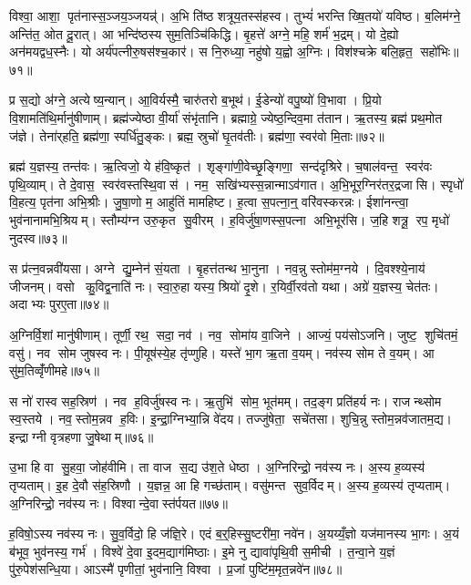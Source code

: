 विश्वा॒ आशा॒ पृत॑नास्स॒ञ्जय॒ञ्जयन्न्॑। अ॒भि ति॑ष्ठ शत्रूय॒तस्स॑हस्व। तुभ्यं॑ भरन्ति ख्षि॒तयो॑ यविष्ठ। ब॒लिम॑ग्ने॒ अन्ति॑त॒ ओत दू॒रात्। आ भन्दि॑ष्ठस्य सुम॒तिञ्चि॑किद्धि। बृ॒हत्ते॑ अग्ने॒ महि॒ शर्म॑ भ॒द्रम्। यो दे॒ह्यो अन॑मयद्वध॒स्नैः। यो अर्य॑पत्नीरु॒षस॑श्च॒कार॑। स नि॒रुध्या॒ नहु॑षो य॒ह्वो अ॒ग्निः। विश॑श्चक्रे बलि॒हृत॒ सहो॑भिः॥७१॥

प्र स॒द्यो अ॑ग्ने॒ अत्येष्य॒न्यान्। आ॒विर्यस्मै॒ चारु॑तरो ब॒भूथ॑। ई॒डेन्यो॑ वपु॒ष्यो॑ वि॒भावा। प्रि॒यो वि॒शामति॑थि॒र्मानु॑षीणाम्। ब्रह्म॑ज्येष्ठा वी॒र्या॑ संभृ॑तानि। ब्रह्माग्रे॒ ज्येष्ठ॒न्दिव॒मा त॑तान। ऋ॒तस्य॒ ब्रह्म॑ प्रथ॒मोत ज॑ज्ञे। तेना॑र्‌हति॒ ब्रह्म॑णा॒ स्पर्धि॑तु॒ङ्कः। ब्रह्म॒ स्रुचो॑ घृ॒तव॑तीः। ब्रह्म॑णा॒ स्वर॑वो मि॒ताः॥७२॥

ब्रह्म॑ य॒ज्ञस्य॒ तन्त॑वः। ऋ॒त्विजो॒ ये ह॑वि॒ष्कृत॑। शृङ्गा॑णी॒वेच्छृ॒ङ्गिणा॒ सन्द॑दृश्रिरे। च॒षाल॑वन्त॒ स्वर॑वः पृथि॒व्याम्। ते दे॒वास॒ स्वर॑वस्तस्थि॒वास॑। नम॒ सखि॑भ्यस्स॒न्नान्माऽव॑गात। अ॒भि॒भूर॒ग्निर॑तर॒द्रजासि। स्पृधो॑ वि॒हत्य॒ पृत॑ना अभि॒श्रीः। जु॒षा॒णो म॒ आहु॑तिं मामहिष्ट। ह॒त्वा स॒पत्ना॒न्॒ वरि॑वस्करन्नः। ईशा॑नन्त्वा॒ भुव॑नानामभि॒श्रियम्। स्तौम्य॑ग्न उरु॒कृत सु॒वीरम्। ह॒विर्जु॑षा॒णस्स॒पत्ना अभि॒भूर॑सि। ज॒हि शत्रू॒ रप॒ मृधो॑ नुदस्व॥७३॥\anuvakamend[वि॒शाञ्ज॑यामसि जीरदानो॒ हर्या॒ विश्वा॒ दिवि॑ष्टिषु॒ वसू॑नि जिगी॒वान्थ्सहो॑भिर्मि॒ता न॑श्च॒त्वारि॑ च]

स प्र॑त्न॒वन्नवी॑यसा। अग्ने द्यु॒म्नेन॑ सं॒यता। बृ॒हत्त॑तन्थ भा॒नुना। नव॒न्नु स्तोम॑म॒ग्नये। दि॒वश्श्ये॒नाय॑ जीजनम्। वसो कु॒विद्व॒नाति॑ नः। स्वा॒रु॒हा यस्य॒ श्रियो॑ दृ॒शे। र॒यिर्वी॒रव॑तो यथा। अग्रे॑ य॒ज्ञस्य॒ चेत॑तः। अदाभ्यः पुरए॒ता॥७४॥

अ॒ग्निर्वि॒शां मानु॑षीणाम्। तूर्णी॒ रथ॒ सदा॒ नव॑। नव॒ सोमा॑य वा॒जिने। आज्यं॒ पय॑सोऽजनि। जुष्ट॒ शुचि॑तमं॒ वसु॑। नव सोम जुषस्व नः। पी॒यूष॑स्ये॒ह तृ॑प्णुहि। यस्ते॑ भा॒ग ऋ॒ता व॒यम्। नव॑स्य सोम ते व॒यम्। आ सु॑म॒तिव्वृँ॑णीमहे॥७५॥

स नो॑ रास्व सह॒स्रिण॑। नव ह॒विर्जु॑षस्व नः। ऋ॒तुभि॑ सोम॒ भूत॑मम्। तद॒ङ्ग प्रति॑हर्य नः। राजन्थ्सोम स्व॒स्तये। नव॒स्तोम॒न्नव ह॒विः। इ॒न्द्रा॒ग्निभ्या॒न्नि वे॑दय। तज्जु॑षेता॒ सचे॑तसा। शुचि॒न्नु स्तोम॒न्नव॑जातम॒द्य। इन्द्राग्नी वृत्रहणा जु॒षेथाम्॥७६॥

उ॒भा हि वा सु॒हवा॒ जोह॑वीमि। ता वाज स॒द्य उ॑श॒ते धेष्ठा। अ॒ग्निरिन्द्रो॒ नव॑स्य नः। अ॒स्य ह॒व्यस्य॑ तृप्यताम्। इ॒ह दे॒वौ स॑ह॒स्रिणौ। य॒ज्ञन्न॒ आ हि गच्छ॑ताम्। वसु॑मन्त सुव॒र्विदम्। अ॒स्य ह॒व्यस्य॑ तृप्यताम्। अ॒ग्निरिन्द्रो॒ नव॑स्य नः। विश्वान्दे॒वास्त॑र्पयत॥७७॥

ह॒विषो॒ऽस्य नव॑स्य नः। सु॒व॒र्विदो॒ हि ज॑ज्ञि॒रे। एदं ब॒र्॒हिस्सु॒ष्टरी॑मा॒ नवे॑न। अ॒यय्यँ॒ज्ञो यज॑मानस्य भा॒गः। अ॒यं ब॑भूव॒ भुव॑नस्य॒ गर्भ॑। विश्वे॑ दे॒वा इ॒दम॒द्याग॑मिष्ठाः। इ॒मे नु द्यावा॑पृथि॒वी स॒मीची। त॒न्वा॒ने य॒ज्ञं पु॑रु॒पेश॑सन्धि॒या। आऽस्मै॑ पृणीतां॒ भुव॑नानि॒ विश्वा। प्र॒जां पुष्टि॑म॒मृत॒न्नवे॑न॥७८॥

